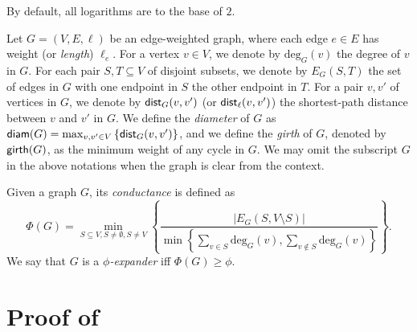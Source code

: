\documentclass[11pt]{article}
\newtheorem{lemma}[theorem]{Lemma}
\theoremstyle{definition}
\newcommand{\set}[1]{\left\{ #1 \right\}}
\newcommand{\diam}{\textnormal{\textsf{diam}}}
\newcommand{\dist}{\textnormal{\textsf{dist}}}
\newcommand{\gir}{\textnormal{\textsf{girth}}}
\newcommand\vol{\mathsf{cost}}
\def\deg{\textrm{deg}}
\def\pr#1{\mathrm{Pr}\left[ #1 \right]}
\def\ex#1{{\mathbb{E}}\left[ #1 \right]}
\newcounter{note}
\begin{document}
\begin{titlepage}
By default, all logarithms are to the base of $2$. 

Let $G=(V,E,\ell)$ be an edge-weighted graph, where each edge $e\in E$ has weight (or \emph{length}) $\ell_e$. 
For a vertex $v\in V$, we denote by $\deg_G(v)$ the degree of $v$ in $G$.
For each pair $S,T\subseteq V$ of disjoint subsets, we denote by $E_{G}(S,T)$ the set of edges in $G$ with one endpoint in $S$ the other endpoint in $T$.
For a pair $v,v'$ of vertices in $G$, we denote by $\dist_{G}(v,v')$ (or $\dist_{\ell}(v,v')$) the shortest-path distance between $v$ and $v'$ in $G$.
We define the \emph{diameter} of $G$ as $\diam(G)=\max_{v,v'\in V}\set{\dist_G(v,v')}$, and we define the \emph{girth} of $G$, denoted by $\gir(G)$, as the minimum weight of any cycle in $G$.
We may omit the subscript $G$ in the above notations when the graph is clear from the context.


Given a graph $G$, its \emph{conductance} 
is defined as 
\[\Phi(G)=\min_{S\subseteq V, S \ne\emptyset, S\ne V}
\set{
\frac{|E_{G}(S,V\setminus S)|}
{\min\set{\sum_{v\in S}\deg_G(v),\sum_{v\notin S}\deg_G(v)}}
	}.\]
We say that $G$ is a \emph{$\phi$-expander} iff $\Phi(G)\ge\phi$. 

\section{Proof of }


\end{titlepage}
\end{document}
